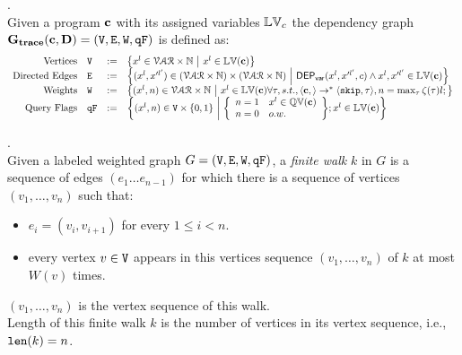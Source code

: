 %
%
\begin{defn}.
\\
Given a program ${\boldsymbol{\mathbf{c}}}$ with its assigned variables $\mathbb{LV}_c$ 
the dependency graph $\bf{G_{trace}}({\boldsymbol{\mathbf{c}}}, D) = (\mathtt{V}, \mathtt{E}, \mathtt{W}, \mathtt{qF})$ is defined as:
%
\[
\begin{array}{rlcl}
  \text{Vertices} &
  \vertxs & := & \left\{ 
  x^l \in \mathcal{VAR} \times \mathbb{N}
  ~ \middle\vert ~
  x^l \in \lvar({\ssa{c}})
  \right\}
  \\
  \text{Directed Edges} &
  \edges & := & 
  \left\{ 
  (x^l, x'^{l'}) \in (\mathcal{VAR} \times \mathbb{N}) \times (\mathcal{VAR} \times \mathbb{N})
  ~ \middle\vert ~
  \vardep(x^l, x'^{l'}, c) \land
  x^l, x'^{l'} \in \lvar({\ssa{c}})
  \right\}
  \\
  \text{Weights} &
  \weights & := & 
  \left\{ 
  (x^l, n) \in \mathcal{VAR} \times \mathbb{N}
  ~ \middle\vert ~ 
  x^l \in \lvar({\ssa{c}}) 
  \forall \vtrace, s.t.,
  \config{\ssa{c}, } \to^{*} \config{\eskip, \vtrace},
  n = \max_{\vtrace}\vcounter(\vtrace)l; 
  \right\}
  \\
  \text{Query Flags} &
  \qflag & := & 
  \left\{(x^l, n)  \in \vertxs \times \{0, 1\} 
  ~ \middle\vert ~
  \left\{
  \begin{array}{ll}
  n = 1 & x^l \in \qvar({\ssa{c}}) \\ 
  n = 0 & o.w.
  \end{array}
  \right\};
  x^l \in \lvar({\ssa{c}})
  \right\}
\end{array}
\]
\end{defn}
%
%
\begin{defn}.
\label{def:finitewalk}
\\
Given a labeled weighted graph $G = (\mathtt{V}, \mathtt{E}, \mathtt{W}, \mathtt{qF})$, a \emph{finite walk} $k$ in $G$ is a sequence of edges $(e_1 \ldots e_{n - 1})$ 
for which there is a sequence of vertices $(v_1, \ldots, v_{n})$ such that:
\begin{itemize}
    \item $e_i = (v_{i},v_{i + 1})$ for every $1 \leq i < n$.
    \item every vertex $v \in \mathtt{V}$ appears in this vertices sequence $(v_1, \ldots, v_{n})$ of $k$ at most $W(v)$ times.  
\end{itemize}
$(v_1, \ldots, v_{n})$ is the vertex sequence of this walk.
\\
%
Length of this finite walk $k$ is the number of vertices in its vertex sequence, i.e., $\mathtt{len}(k) = n$.
\end{defn}

